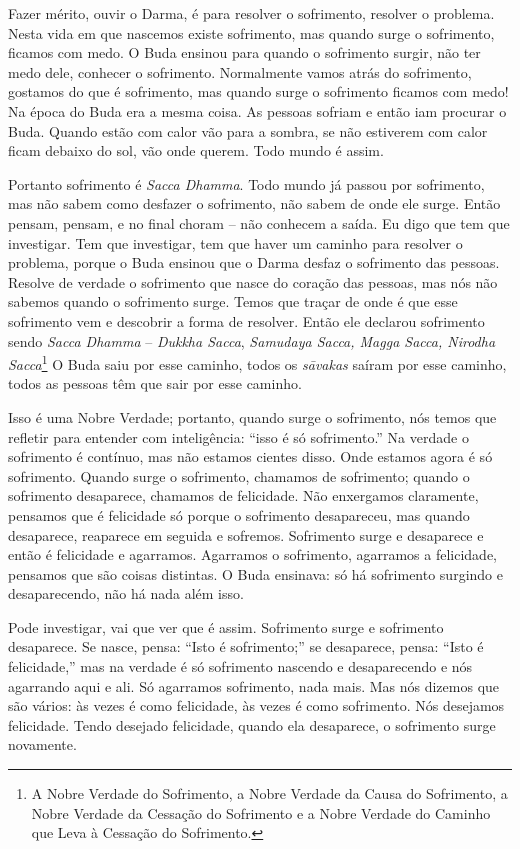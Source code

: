 Fazer mérito, ouvir o Darma, é para resolver o sofrimento, resolver
o problema. Nesta vida em que nascemos existe sofrimento, mas quando
surge o sofrimento, ficamos com medo. O Buda ensinou para quando o
sofrimento surgir, não ter medo dele, conhecer o sofrimento.
Normalmente vamos atrás do sofrimento, gostamos do que é sofrimento,
mas quando surge o sofrimento ficamos com medo! Na época do Buda era a
mesma coisa. As pessoas sofriam e então iam procurar o Buda. Quando
estão com calor vão para a sombra, se não estiverem com calor ficam
debaixo do sol, vão onde querem. Todo mundo é assim. 

Portanto sofrimento é \textit{Sacca Dhamma}. Todo mundo já passou
por sofrimento, mas não sabem como desfazer o sofrimento, não sabem de
onde ele surge. Então pensam, pensam, e no final choram
– não conhecem a saída. Eu digo que tem que
investigar. Tem que investigar, tem que haver um caminho para resolver
o problema, porque o Buda ensinou que o Darma desfaz o sofrimento das
pessoas. Resolve de verdade o sofrimento que nasce do coração das
pessoas, mas nós não sabemos quando o sofrimento surge. Temos que
traçar de onde é que esse sofrimento vem e descobrir a forma de
resolver. Então ele declarou sofrimento sendo \textit{Sacca Dhamma} –
\textit{Dukkha Sacca}, \textit{Samudaya Sacca, Magga Sacca, Nirodha
Sacca}\footnote{A Nobre Verdade do Sofrimento, a Nobre Verdade da Causa
do Sofrimento, a Nobre Verdade da Cessação do Sofrimento e a Nobre
Verdade do Caminho que Leva à Cessação do Sofrimento.} O Buda saiu por
esse caminho, todos os \textit{sāvakas} saíram por esse caminho,
todos as pessoas têm que sair por esse caminho. 

Isso é uma Nobre Verdade; portanto, quando surge o sofrimento, nós
temos que refletir para entender com inteligência: “isso é só
sofrimento.” Na verdade o sofrimento é contínuo, mas não estamos
cientes disso. Onde estamos agora é só sofrimento. Quando surge o
sofrimento, chamamos de sofrimento; quando o sofrimento desaparece,
chamamos de felicidade. Não enxergamos claramente, pensamos que é
felicidade só porque o sofrimento desapareceu, mas quando desaparece,
reaparece em seguida e sofremos. Sofrimento
surge e desaparece e então é felicidade e agarramos. Agarramos o
sofrimento, agarramos a felicidade, pensamos que são coisas distintas.
O Buda ensinava: só há sofrimento surgindo e desaparecendo, não há nada
além isso. 

Pode investigar, vai que ver que é assim. Sofrimento surge e
sofrimento desaparece. Se nasce, pensa: “Isto é sofrimento;” se
desaparece, pensa: “Isto é felicidade,” mas na verdade é só sofrimento
nascendo e desaparecendo e nós agarrando aqui e ali. Só agarramos
sofrimento, nada mais. Mas nós dizemos que são vários: às vezes é como
felicidade, às vezes é como sofrimento. Nós desejamos felicidade. Tendo
desejado felicidade, quando ela desaparece, o sofrimento surge
novamente. 

